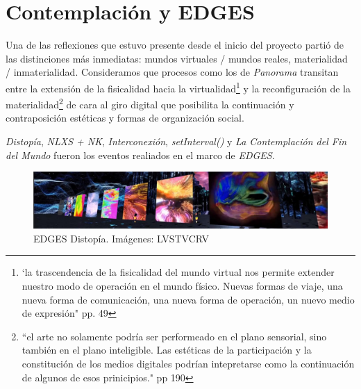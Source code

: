 
\section*{Contemplación y EDGES} %

\color{BlueViolet}

Una de las reflexiones que estuvo presente desde el inicio del proyecto partió de las distinciones más inmediatas: mundos virtuales / mundos reales, materialidad / inmaterialidad. Consideramos que procesos como los de \textit{Panorama} transitan entre la extensión de la fisicalidad hacia la virtualidad\footnote{`la trascendencia de la fisicalidad del mundo virtual nos permite extender nuestro modo de operación en el mundo físico. Nuevas formas de viaje, una nueva forma de comunicación, una nueva forma de operación, un nuevo medio de expresión" pp. 49} \citep{cyberspace} y la reconfiguración de la materialidad\footnote{``el arte no solamente podría ser performeado en el plano sensorial, sino también en el plano inteligible. Las estéticas de la participación y la constitución de los medios digitales podrían intepretarse como la continuación de algunos de esos prinicipios." pp 190} \citep{andreasosa} de cara al giro digital que posibilita la continuación y contraposición estéticas y formas de organización social. 

\color{black}

\textit{Distopía}, \textit{NLXS + NK}, \textit{Interconexión}, \textit{setInterval()} y \textit{La Contemplación del Fin del Mundo} fueron los eventos realiados en el marco de \textit{EDGES}. 

\begin{figure}[H]
  \includegraphics[width=\textwidth]{img/distopia.png}
  \caption{EDGES Distopía. Imágenes: LVSTVCRV}
\end{figure}

